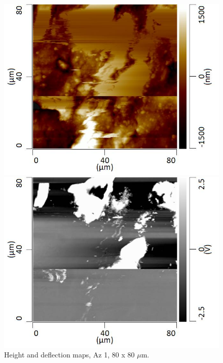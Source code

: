 \begin{figure}[H]
\centering
\begin{minipage}{.45\textwidth}
  \centering
  \includegraphics[width=\linewidth]{Az1_tapping_mode_240521_height_1}
\end{minipage}
\begin{minipage}{.45\textwidth}
  \centering
  \includegraphics[width=\linewidth]{Az1_tapping_mode_240521_def_1}
\end{minipage}
\caption[Height and deflection maps, Az 1]{Height and deflection maps, Az 1, 80 x 80 $\mu$m.}
\label{fig:afm_az1_height_def_1}
\end{figure}

